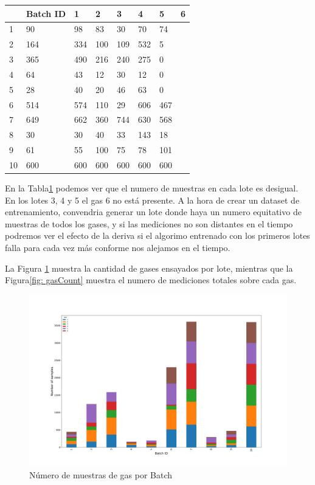 \begin{table}
    \centering
    \begin{tabular}{|l|l|l|l|l|l|l|l|}
    \hline
         & Batch ID & 1 & 2 & 3 & 4 & 5 & 6 \\ \hline
        1 & 90   & 98  & 83  & 30  & 70  & 74 &  \\ \hline
        2 & 164  & 334 & 100 & 109 & 532 & 5   &  \\ \hline
        3 & 365  & 490 & 216 & 240 & 275 & 0   &  \\ \hline
        4 & 64   & 43  & 12  & 30  & 12  & 0   &  \\ \hline
        5 & 28   & 40  & 20  & 46  & 63  & 0   &  \\ \hline
        6 & 514  & 574 & 110 & 29  & 606 & 467 &  \\ \hline
        7 & 649  & 662 & 360 & 744 & 630 & 568 &  \\ \hline
        8 & 30   & 30  & 40  & 33  & 143 & 18  &  \\ \hline
        9 & 61   & 55  & 100 & 75  & 78  & 101 &  \\ \hline
        10 & 600 & 600 & 600 & 600 & 600 & 600 &  \\ \hline
    \end{tabular}
    \label{Tab: Numero de Gases por cada Batch}
\end{table}

En la Tabla\ref{Tab: Numero de Gases por cada Batch} podemos ver que el numero de muestras en cada lote
es desigual. En los lotes 3, 4 y 5 el gas 6 no está presente. A la hora de crear un dataset de entrenamiento,
convendria generar un lote donde haya un numero equitativo de muestras de todos los gases,
y si las mediciones no son distantes en el tiempo podremos ver el efecto de la deriva si el algorimo entrenado con
los primeros lotes falla para cada vez más conforme nos alejamos en el tiempo.

La Figura \ref{fig: gasBatchCount} muestra la cantidad de gases ensayados por lote, mientras que
la Figura\ref{fig: gasCount} muestra el numero de mediciones totales sobre cada gas.

\begin{figure}[ht!]
	\centering
	\includegraphics[width=\columnwidth]{../py_imgs/Step0_Count_Batch_Gas.png}
	\caption{Número de muestras de gas por Batch}
	\label{fig: gasBatchCount}
\end{figure}


